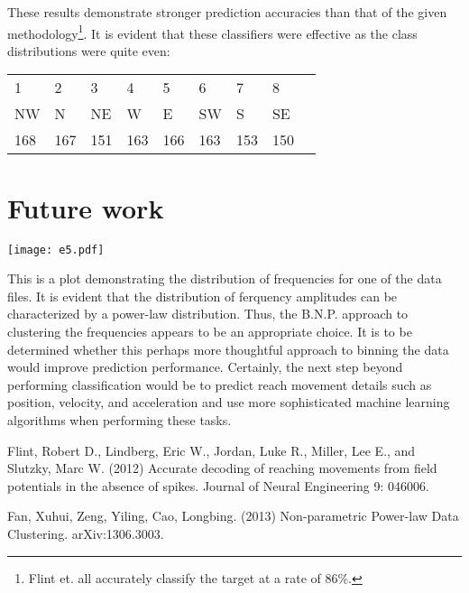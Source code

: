 \documentclass{article}
\begin{document}
\noindent
These results demonstrate stronger prediction accuracies than that of the given methodology\cite{flint}\footnote{Flint et. all accurately classify the target at a rate of 86\%.}.  It is evident that these classifiers were effective as the class distributions were quite even:  \\
\noindent
\begin{table}[h]
\begin{tabular}{lllllllll}
1   & 2   & 3   & 4   & 5   & 6   & 7   & 8   \\
NW  & N   & NE  & W   & E   & SW  & S   & SE  \\
168 & 167 & 151 & 163 & 166 & 163 & 153 & 150
\end{tabular}
\end{table}

\section{Future work}
\noindent
\begin{centering}
\texttt{[image: e5.pdf]}
\end{centering}
This is a plot demonstrating the distribution of frequencies for one of the data files.  It is evident that the distribution of ferquency amplitudes can be characterized by a power-law distribution.   Thus, the B.N.P. approach to clustering the frequencies appears to be an appropriate choice.  It is to be determined whether this perhaps more thoughtful approach to binning the data would improve prediction performance.  Certainly, the next step beyond performing classification would be to predict reach movement details such as position, velocity, and acceleration and use more sophisticated machine learning algorithms when performing these tasks.


\begin{thebibliography}{9}

Flint, Robert D., Lindberg, Eric W., Jordan, Luke R., Miller, Lee E., and Slutzky, Marc W. (2012) Accurate decoding of reaching movements from field potentials in the absence of spikes.  Journal of Neural Engineering 9: 046006. 

Fan, Xuhui, Zeng, Yiling, Cao, Longbing. (2013) Non-parametric Power-law Data Clustering.  arXiv:1306.3003.

\end{thebibliography}
\end{document}
